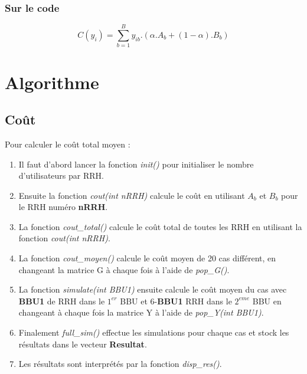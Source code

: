 \documentclass[a4paper,sans,titlepage,10pt]{article}
\begin{document}
\subsubsection{Sur le code}
\begin{displaymath}
C(y_i)= \sum_{b=1}^By_{ib}.(\alpha.A_b+(1-\alpha).B_b)
\end{displaymath}
\section{Algorithme}
\subsection{Coût}
Pour calculer le coût total moyen :
\begin{enumerate}
\item Il faut d'abord lancer la fonction \textit{init()} pour initialiser le nombre d'utilisateurs par RRH.
\item Ensuite la fonction \textit{cout(int nRRH)} calcule le coût en utilisant $A_b$ et 
$B_b$ pour le RRH numéro \textbf{nRRH}.
\item La fonction \textit{cout\_total()} calcule le coût total de toutes les RRH en utilisant la fonction \textit{cout(int nRRH)}.
\item La fonction \textit{cout\_moyen()} calcule le coût moyen de 20 cas différent, en changeant la matrice G à chaque fois à l'aide de \textit{pop\_G()}.
\item La fonction \textit{simulate(int BBU1)} ensuite calcule le coût moyen du cas avec \textbf{BBU1} de RRH dans le $1^{er}$ BBU et 6-\textbf{BBU1} RRH dans le $2^{eme}$ BBU
en changeant à chaque fois la matrice Y à l'aide de \textit{pop\_Y(int BBU1)}.
\item Finalement \textit{full\_sim()} effectue les simulations pour chaque cas et stock 
les résultats dans le vecteur \textbf{Resultat}.
\item Les résultats sont interprétés par la fonction \textit{disp\_res()}.
\end{enumerate} 
\end{document}
